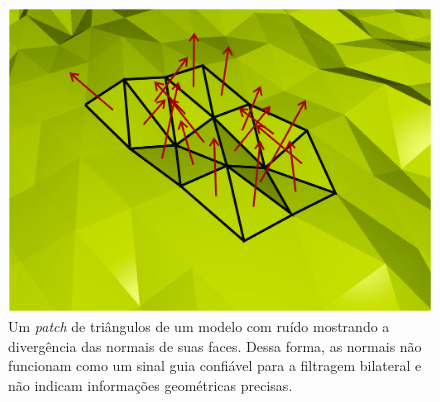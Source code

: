 \begin{figure}[!h]
\captionsetup{width=\linewidth}
\centering
\includegraphics[scale=0.83]{figuras/meshnormals.jpg}
\caption{Um \textit{patch} de triângulos de um modelo com ruído mostrando a divergência das normais de suas faces. Dessa forma, as normais não funcionam como um sinal guia confiável para a filtragem bilateral e não indicam informações geométricas precisas.}
\label{fig:meshpatchnormals}
\end{figure}

